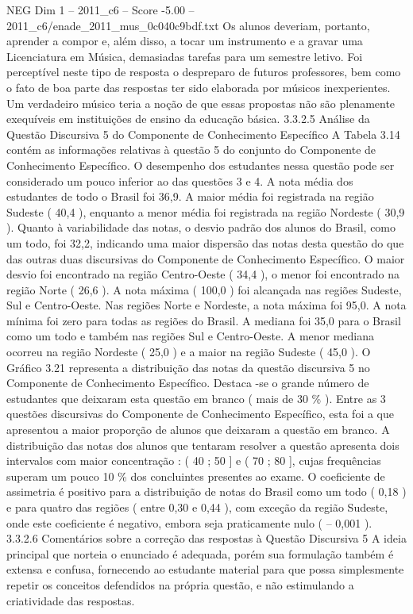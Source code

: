 \begin{textsample}{NEG Dim 1 – 2011\_c6 – Score -5.00 – 2011\_c6/enade\_2011\_mus\_0c040c9bdf.txt}
Os alunos deveriam, portanto, aprender a compor e, além disso, a tocar um instrumento e a gravar uma Licenciatura em Música, demasiadas tarefas para um semestre letivo.
Foi perceptível neste tipo de resposta o despreparo de futuros professores, bem como o fato de boa parte das respostas ter sido elaborada por músicos inexperientes.
Um verdadeiro músico teria a noção de que essas propostas não são plenamente exequíveis em instituições de ensino da educação básica. 3.3.2.5 Análise da Questão Discursiva 5 do Componente de Conhecimento Específico A Tabela 3.14 contém as informações relativas à questão 5 do conjunto do Componente de Conhecimento Específico.
O desempenho dos estudantes nessa questão pode ser considerado um pouco inferior ao das questões 3 e 4.
A nota média dos estudantes de todo o Brasil foi 36,9.
A maior média foi registrada na região Sudeste ( 40,4 ), enquanto a menor média foi registrada na região Nordeste ( 30,9 ).
Quanto à variabilidade das notas, o desvio padrão dos alunos do Brasil, como um todo, foi 32,2, indicando uma maior dispersão das notas desta questão do que das outras duas discursivas do Componente de Conhecimento Específico.
O maior desvio foi encontrado na região Centro-Oeste ( 34,4 ), o menor foi encontrado na região Norte ( 26,6 ).
A nota máxima ( 100,0 ) foi alcançada nas regiões Sudeste, Sul e Centro-Oeste.
Nas regiões Norte e Nordeste, a nota máxima foi 95,0.
A nota mínima foi zero para todas as regiões do Brasil.
A mediana foi 35,0 para o Brasil como um todo e também nas regiões Sul e Centro-Oeste.
A menor mediana ocorreu na região Nordeste ( 25,0 ) e a maior na região Sudeste ( 45,0 ).
O Gráfico 3.21 representa a distribuição das notas da questão discursiva 5 no Componente de Conhecimento Específico.
Destaca -se o grande número de estudantes que deixaram esta questão em branco ( mais de 30 \% ).
Entre as 3 questões discursivas do Componente de Conhecimento Específico, esta foi a que apresentou a maior proporção de alunos que deixaram a questão em branco.
A distribuição das notas dos alunos que tentaram resolver a questão apresenta dois intervalos com maior concentração : ( 40 ; 50 ] e ( 70 ; 80 ], cujas frequências superam um pouco 10 \% dos concluintes presentes ao exame.
O coeficiente de assimetria é positivo para a distribuição de notas do Brasil como um todo ( 0,18 ) e para quatro das regiões ( entre 0,30 e 0,44 ), com exceção da região Sudeste, onde este coeficiente é negativo, embora seja praticamente nulo ( – 0,001 ). 3.3.2.6 Comentários sobre a correção das respostas à Questão Discursiva 5 A ideia principal que norteia o enunciado é adequada, porém sua formulação também é extensa e confusa, fornecendo ao estudante material para que possa simplesmente repetir os conceitos defendidos na própria questão, e não estimulando a criatividade das respostas.

\end{textsample}
